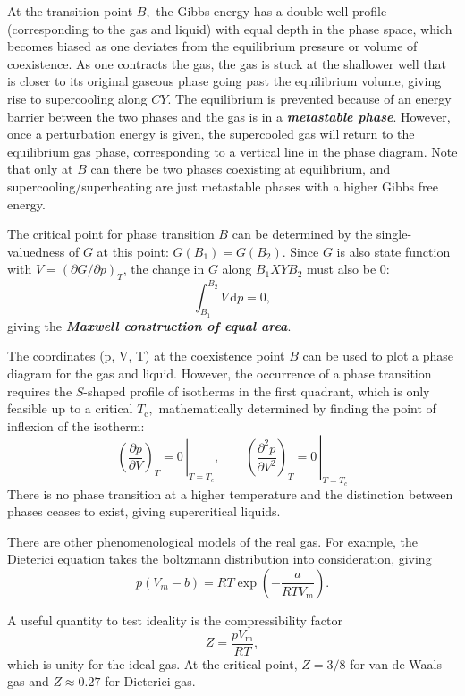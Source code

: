 \documentclass{article}
\theoremstyle{nonumberplain}
\begin{document}
At the transition point $B,$ the Gibbs energy has a double well profile (corresponding to the gas and liquid) with equal depth in the phase space, which becomes biased as one deviates from the equilibrium pressure or volume of coexistence. As one contracts the gas, the gas is stuck at the shallower well that is closer to its original gaseous phase going past the equilibrium volume, giving rise to supercooling along $CY.$ The equilibrium is prevented because of an energy barrier between the two phases and the gas is in a \textit{\textbf{metastable phase}}. However, once a perturbation energy is given, the supercooled gas will return to the equilibrium gas phase, corresponding to a vertical line in the phase diagram. Note that only at $B$ can there be two phases coexisting at equilibrium, and supercooling/superheating are just metastable phases with a higher Gibbs free energy. 

The critical point for phase transition $B$ can be determined by the single-valuedness of $G$ at this point: $G(B_1) = G(B_2). $ Since $G$ is also state function with $V = (\partial G / \partial p )_T$, the change in $G$ along $B_1XYB_2$ must also be 0: 
\[
    \int_{B_1}^{B_2} V  \,\mathrm{d}p =0,
\]
giving the \textit{\textbf{Maxwell construction of equal area}}.  

The coordinates (p, V, T) at the coexistence point $B$ can be used to plot a phase diagram for the gas and liquid. However, the occurrence of a phase transition requires the $S$-shaped profile of isotherms in the first quadrant, which is only feasible up to a critical $T_\mathrm{c},$ mathematically determined by finding the point of inflexion of the isotherm:
\[
    \boxed{
        \left. \left(\frac{\partial p}{\partial V} \right)_T  = 0 \, \right \vert_{T= T_c}, \qquad
        \left. \left(\frac{\partial^{2}  p}{\partial V^{2} } \right)_T  = 0 \, \right \vert_{T= T_c}
    }
\]
There is no phase transition at a higher temperature and the distinction between phases ceases to exist, giving supercritical liquids.

There are other phenomenological models of the real gas. For example, the Dieterici equation takes the boltzmann distribution into consideration, giving 
\[
    p (V_m - b) = RT \mathrm{\exp } \left( -\frac{a}{RT V_\mathrm{m} }\right).
\]

A useful quantity to test ideality is the compressibility factor 
\[
    Z = \frac{pV_\mathrm{m} }{RT}, 
\]
which is unity for the ideal gas. At the critical point, $Z = 3 /8$ for van de Waals gas and $Z \approx 0.27 $ for Dieterici gas. 
\end{document}
